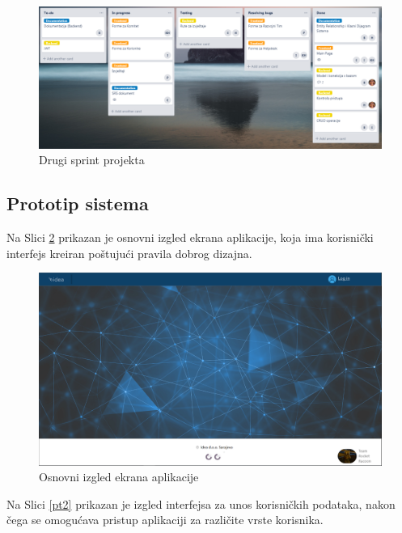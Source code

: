 \documentclass[12pt,a4paper]{article}
\begin{document}
\begin{figure}[H]
\center
\includegraphics[scale=0.4]{../res/Trello/trello4.PNG}
\caption{Drugi sprint projekta}
\label{trello4}
\end{figure}

\newpage

\subsection{Prototip sistema}

\quad Na Slici \ref{pt1} prikazan je osnovni izgled ekrana aplikacije, koja ima korisnički interfejs kreiran poštujući pravila dobrog  dizajna.

\begin{figure}[H]
\center
\includegraphics[scale=0.4]{../res/Prototype/Main.PNG}
\caption{Osnovni izgled ekrana aplikacije}
\label{pt1}
\end{figure}

Na Slici \ref{pt2} prikazan je izgled interfejsa za unos korisničkih podataka, nakon čega se omogućava pristup aplikaciji za različite vrste korisnika.
\end{document}
